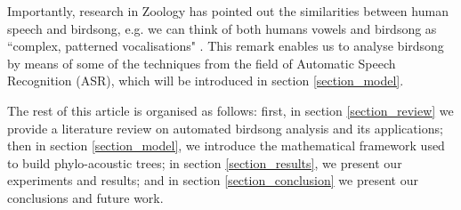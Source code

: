 \documentclass[pdftex,11pt,a4paper]{article}
\theoremstyle{definition}
\theoremstyle{remark}
\begin{document}
\par Importantly, research in Zoology has pointed out the similarities between human speech and birdsong, e.g. we can think of both humans vowels and birdsong as ``complex, patterned vocalisations" \cite{Berwick2013,Naguib2014}. This remark enables us to analyse birdsong by means of some of the techniques from the field of Automatic Speech Recognition (ASR), which will be introduced in section \ref{section_model}. 
\par The rest of this article is organised as follows: first, in section \ref{section_review} we provide a literature review on automated birdsong analysis and its applications; then in section \ref{section_model}, we introduce the mathematical framework used to build phylo-acoustic trees; in section \ref{section_results}, we present our experiments and results; and in section \ref{section_conclusion} we present our conclusions and future work.
\end{document}
